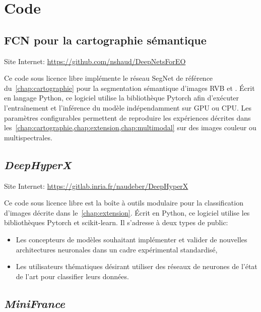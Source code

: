 %
%
\printbibliography

\chapter{Code}

\section{FCN pour la cartographie sémantique}

Site Internet: \url{https://github.com/nshaud/DeepNetsForEO}

Ce code sous licence libre implémente le réseau SegNet de référence du~\cref{chap:cartographie} pour la segmentation sémantique d'images \gls{RVB} et . Écrit en langage Python, ce logiciel utilise la bibliothèque Pytorch afin d'exécuter l'entraînement et l'inférence du modèle indépendamment sur \gls{GPU} ou \gls{CPU}. Les paramètres configurables permettent de reproduire les expériences décrites dans les~\cref{chap:cartographie,chap:extension,chap:multimodal} sur des images couleur ou multispectrales.

\section{\emph{DeepHyperX}}

Site Internet: \url{https://gitlab.inria.fr/naudeber/DeepHyperX}

Ce code sous licence libre est la boîte à outils modulaire pour la classification d'images  décrite dans le~\cref{chap:extension}. Écrit en Python, ce logiciel utilise les bibliothèques Pytorch et scikit-learn. Il s'adresse à deux types de public:
\begin{itemize}
	\item Les concepteurs de modèles souhaitant implémenter et valider de nouvelles architectures neuronales dans un cadre expérimental standardisé,
	\item Les utilisateurs thématiques désirant utiliser des réseaux de neurones de l'état de l'art pour classifier leurs données.
\end{itemize}

\section{\emph{MiniFrance}}

